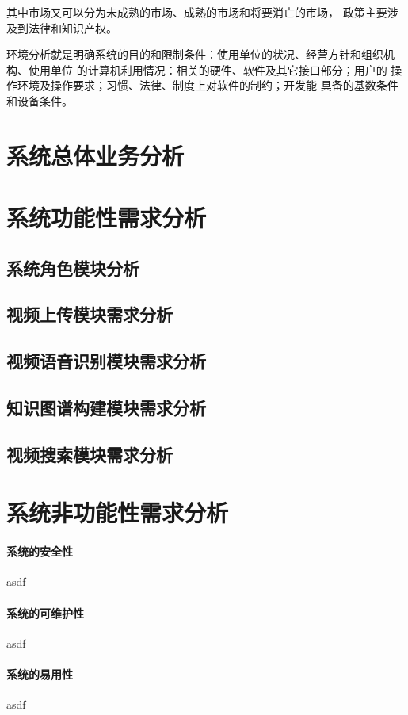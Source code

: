 \documentclass[12pt,a4paper,fancyhdr,openany,oneside]{ctexbook}
\begin{document}
其中市场又可以分为未成熟的市场、成熟的市场和将要消亡的市场，
政策主要涉及到法律和知识产权。

环境分析就是明确系统的目的和限制条件：使用单位的状况、经营方针和组织机构、使用单位
的计算机利用情况：相关的硬件、软件及其它接口部分；用户的
操作环境及操作要求；习惯、法律、制度上对软件的制约；开发能
具备的基数条件和设备条件。



\section{系统总体业务分析}

\section{系统功能性需求分析}
\subsection{系统角色模块分析}
\subsection{视频上传模块需求分析}
\subsection{视频语音识别模块需求分析}
\subsection{知识图谱构建模块需求分析}
\subsection{视频搜索模块需求分析}


\section{系统非功能性需求分析}
\paragraph{系统的安全性}asdf
\paragraph{系统的可维护性}asdf
\paragraph{系统的易用性}asdf
\end{document}
